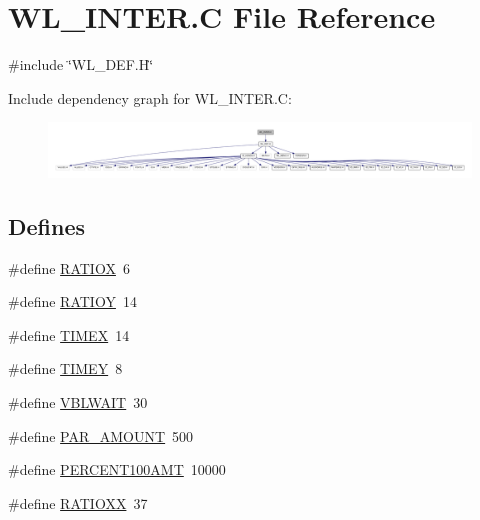 \hypertarget{WL__INTER_8C}{
\section{WL\_\-INTER.C File Reference}
\label{WL__INTER_8C}
}
{\ttfamily \#include \char`\"{}WL\_\-DEF.H\char`\"{}}\par
Include dependency graph for WL\_\-INTER.C:
\nopagebreak
\begin{figure}[H]
\begin{center}
\leavevmode
\includegraphics[width=400pt]{WL__INTER_8C__incl}
\end{center}
\end{figure}
\subsection*{Defines}
\begin{DoxyCompactItemize}
\item 
\#define \hyperlink{WL__INTER_8C_a2cf43e900bb281b39b5d58f59bbe45da}{RATIOX}~6
\item 
\#define \hyperlink{WL__INTER_8C_a1d637d5ac9cd9bae9d726959f61437c0}{RATIOY}~14
\item 
\#define \hyperlink{WL__INTER_8C_a32eeb5ea5d3a32039c13b74137dc5bc0}{TIMEX}~14
\item 
\#define \hyperlink{WL__INTER_8C_a3662b0eb834e198ab900720e51ee03ad}{TIMEY}~8
\item 
\#define \hyperlink{WL__INTER_8C_ab64ae2457b96475a0ad9bcf5088acc8e}{VBLWAIT}~30
\item 
\#define \hyperlink{WL__INTER_8C_a03af7e2635475ea9e7d82dbbdfb63d36}{PAR\_\-AMOUNT}~500
\item 
\#define \hyperlink{WL__INTER_8C_a0dfa3c33be744c938e397f67877a27cb}{PERCENT100AMT}~10000
\item 
\#define \hyperlink{WL__INTER_8C_ad72246e57edaf2c7c8d190711c5f187b}{RATIOXX}~37
\end{DoxyCompactItemize}
